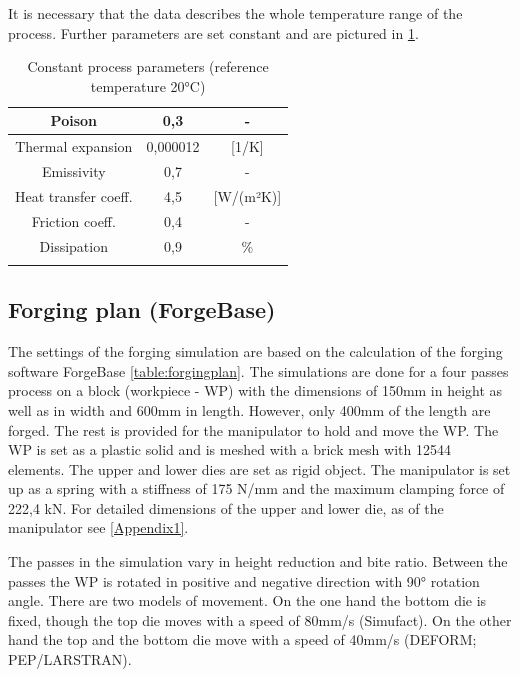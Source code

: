 It is necessary that the data describes the whole temperature range of the process. Further parameters are set constant and are pictured in \ref{table:processparameter}. 

\begin{table}[!htbp][width=0.8\textwidth]
 \centering
 \caption{Constant process parameters (reference temperature 20°C)}
 \begin{tabular}{|c|c|c|}
 \hline
 Poison&0,3&-\\
 \hline
 Thermal expansion&0,000012&[1/K]\\
 \hline
 Emissivity&0,7&-\\
 \hline
 Heat transfer coeff.&4,5&[W/(m²K)]\\
 \hline
 Friction coeff.&0,4&-\\
 \hline
 Dissipation&0,9&\%\\
 \hline
 \label{table:processparameter}
 \end{tabular}
\end{table}

\subsection{Forging plan (ForgeBase)}
The settings of the forging simulation are based on the calculation of the forging software ForgeBase \ref{table:forgingplan}. The simulations are done for a four passes process on a block (workpiece - WP) with the dimensions of 150mm in height as well as in width and 600mm in length. However, only 400mm of the length are forged. The rest is provided for the manipulator to hold and move the WP. The WP is set as a plastic solid and is meshed with a brick mesh with 12544 elements. The upper and lower dies are set as rigid object. The manipulator is set up as a spring with a stiffness of 175 N/mm and the maximum clamping force of 222,4 kN. For detailed dimensions of the upper and lower die, as of the manipulator see \ref{Appendix1}.\par 

The passes in the simulation vary in height reduction and bite ratio. Between the passes the WP is rotated in positive and negative direction with 90° rotation angle. There are two models of movement. On the one hand the bottom die is fixed, though the top die moves with a speed of 80mm/s (Simufact). On the other hand the top and the bottom die move with a speed of 40mm/s (DEFORM; PEP/LARSTRAN).

